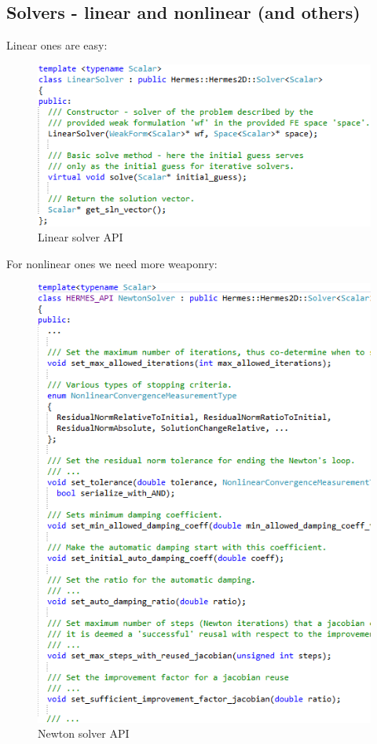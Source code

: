 \documentclass{beamer}
\begin{document}
\subsection{Solvers - linear and nonlinear (and others)}
\begin{frame}
\begin{minipage}{.49\textwidth}
Linear ones are easy:\ \\
\vspace{10mm}
\begin{figure}
	\centering
	\includegraphics[width=.9\textwidth]{codeimg/linearSolver.png}
	\vspace{-4mm}
	\caption{Linear solver API}
\end{figure}
\vspace{20mm}
\end{minipage}
\begin{minipage}{.49\textwidth}
For nonlinear ones we need more weaponry:
\begin{figure}
	\centering
	\includegraphics[width=.9\textwidth]{codeimg/nonlinearSolver.png}
	\vspace{-4mm}
	\caption{Newton solver API}
\end{figure}
\end{minipage}


\end{frame}
\end{document}
